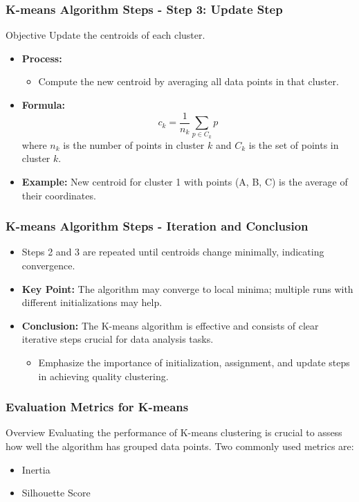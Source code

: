 \documentclass[aspectratio=169]{beamer}
\begin{document}
\begin{frame}[fragile]
    \frametitle{K-means Algorithm Steps - Step 3: Update Step}
    \begin{block}{Objective}
        Update the centroids of each cluster.
    \end{block}
    \begin{itemize}
        \item \textbf{Process:}
        \begin{itemize}
            \item Compute the new centroid by averaging all data points in that cluster.
        \end{itemize}
        \item \textbf{Formula:}
        \begin{equation}
            c_k = \frac{1}{n_k} \sum_{p \in C_k} p
        \end{equation}
        where \( n_k \) is the number of points in cluster \( k \) and \( C_k \) is the set of points in cluster \( k \).
        \item \textbf{Example:} New centroid for cluster 1 with points (A, B, C) is the average of their coordinates.
    \end{itemize}
\end{frame}

\begin{frame}[fragile]
    \frametitle{K-means Algorithm Steps - Iteration and Conclusion}
    \begin{itemize}
        \item Steps 2 and 3 are repeated until centroids change minimally, indicating convergence.
        \item \textbf{Key Point:} The algorithm may converge to local minima; multiple runs with different initializations may help.
        \item \textbf{Conclusion:} The K-means algorithm is effective and consists of clear iterative steps crucial for data analysis tasks.
        \begin{itemize}
            \item Emphasize the importance of initialization, assignment, and update steps in achieving quality clustering.
        \end{itemize}
    \end{itemize}
\end{frame}

\begin{frame}[fragile]
    \frametitle{Evaluation Metrics for K-means}
    \begin{block}{Overview}
        Evaluating the performance of K-means clustering is crucial to assess how well the algorithm has grouped data points. Two commonly used metrics are:
        \begin{itemize}
            \item Inertia
            \item Silhouette Score
        \end{itemize}
    \end{block}
\end{frame}
\end{document}
